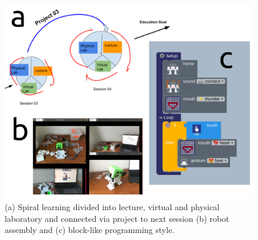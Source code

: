 \documentclass[sigconf]{acmart}
\begin{document}
\begin{figure}[h]
  \centering
  \includegraphics[width=\linewidth]{../figures/teaching-materials/versions/drawing-v00.png}
  \caption{(a) Spiral learning divided into lecture, virtual and physical laboratory and connected via project to next session \cite{tarik2017} (b) robot assembly and (c) block-like programming style.}
  \label{fig:tm}
\end{figure}
 


\end{document}
